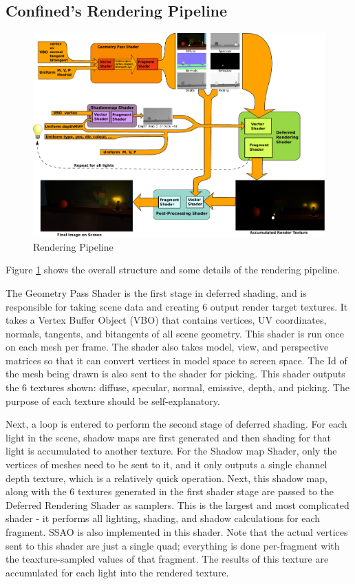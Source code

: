 \documentclass{book}
\begin{document}
    \subsection{Confined's Rendering Pipeline}
      \begin{figure}[h!]
        \centering
        \includegraphics[width=1.0\textwidth]{rendering_pipeline}
        \caption{Rendering Pipeline}
        \label{pipeline-img}
      \end{figure}

      Figure \ref{pipeline-img} shows the overall structure and some details of the rendering pipeline.

      The Geometry Pass Shader is the first stage in deferred shading, and is responsible for taking scene data and creating 6 output render target textures. It takes a Vertex Buffer Object (VBO) that contains vertices, UV coordinates, normals, tangents, and bitangents of all scene geometry. This shader is run once on each mesh per frame. The shader also takes model, view, and perspective matrices so that it can convert vertices in model space to screen space. The Id of the mesh being drawn is also sent to the shader for picking. This shader outputs the 6 textures shown: diffuse, specular, normal, emissive, depth, and picking. The purpose of each texture should be self-explanatory.

      Next, a loop is entered to perform the second stage of deferred shading. For each light in the scene, shadow maps are first generated and then shading for that light is accumulated to another texture. For the Shadow map Shader, only the vertices of meshes need to be sent to it, and it only outputs a single channel depth texture, which is a relatively quick operation. Next, this shadow map, along with the 6 textures generated in the first shader stage are passed to the Deferred Rendering Shader as samplers. This is the largest and most complicated shader - it performs all lighting, shading, and shadow calculations for each fragment. SSAO is also implemented in this shader. Note that the actual vertices sent to this shader are just a single quad; everything is done per-fragment with the teaxture-sampled values of that fragment. The results of this texture are accumulated for each light into the rendered texture.
\end{document}

